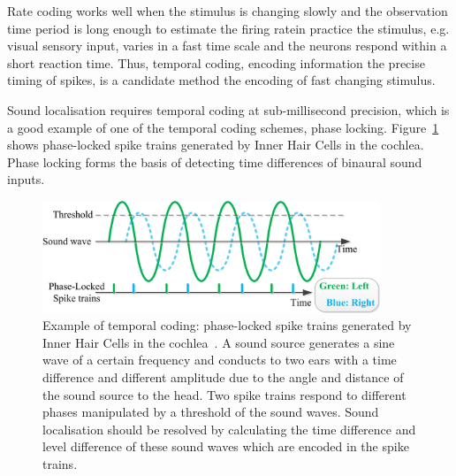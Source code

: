 Rate coding works well when the stimulus is changing slowly and the observation time period is long enough to estimate the firing rate\DIFdelbegin {}\DIFdelend \DIFaddbegin {}\DIFaddend in practice the stimulus, e.g. visual sensory input, varies in a fast time scale and the neurons respond within a short reaction time.
Thus, temporal coding, encoding information \DIFdelbegin {}\DIFdelend \DIFaddbegin {}\DIFaddend the precise timing of spikes, is a candidate method \DIFdelbegin {}\DIFdelend \DIFaddbegin {}\DIFaddend the encoding of \DIFaddbegin {}\DIFaddend fast changing stimulus.

Sound localisation requires temporal coding at sub-millisecond precision, which is a good example of one of the temporal coding schemes, phase locking.
Figure~\ref{Fig:audio_fibre} shows phase-locked spike trains generated by Inner Hair Cells in the cochlea.
Phase locking forms the basis
of detecting time differences of binaural sound inputs.
\begin{figure}[bt]
	\centering
	\includegraphics[width=0.9\textwidth]{pics_snn/phaselocking.png}
	\caption{Example of temporal coding: phase-locked spike trains generated by Inner Hair Cells in the cochlea~\citep{liu2013modeling}.
	A sound source generates a sine wave of a certain frequency and conducts to two ears with a time difference and different amplitude due to the angle and distance of the sound source to the head.
	Two spike trains respond to different phases manipulated by a threshold of the sound waves.
	Sound localisation should be resolved by calculating the time difference and level difference of these sound waves which are encoded in the spike trains.
    }
	\label{Fig:audio_fibre}
\end{figure}

